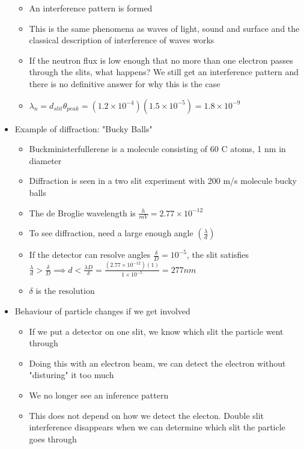 \documentclass[12pt]{article}
\begin{document}
\begin{itemize}
\begin{itemize}
        \item An interference pattern is formed
        \item This is the same phenomena as waves of light, sound and surface and the classical description of interference of waves works
        \item If the neutron flux is low enough that no more than one electron passes through the slits, what happens? We still get an interference pattern and there is no definitive answer for why this is the case
        \item $\lambda_n = d_{slit} \theta_{peak} = (1.2 \times 10^{-4})(1.5 \times 10^{-5}) = 1.8 \times 10^{-9}$
    \end{itemize}
    \item Example of diffraction: "Bucky Balls" \begin{itemize}
        \item Buckministerfullerene is a molecule consisting of 60 C atoms, 1 nm in diameter
        \item Diffraction is seen in a two slit experiment with 200 m/s molecule bucky balls 
        \item The de Broglie wavelength is $\frac{h}{mV} = 2.77 \times 10^{-12}$
        \item To see diffraction, need a large enough angle $(\frac{\lambda}{d})$
        \item If the detector can resolve angles $\frac{\delta}{D} = 10^{-5}$, the slit satisfies $\frac{\lambda}{d} > \frac{\delta}{D} \implies d < \frac{\lambda D}{\delta} = \frac{(2.77 \times 10^{-12})(1)}{1 \times 10^{-5}} = 277 nm$
        \item $\delta$ is the resolution
    \end{itemize}
    \item Behaviour of particle changes if we get involved \begin{itemize}
        \item If we put a detector on one slit, we know which slit the particle went through
        \item Doing this with an electron beam, we can detect the electron without "disturing" it too much
        \item We no longer see an inference pattern
        \item This does not depend on how we detect the electon. Double slit interference disappears when we can determine which slit the particle goes through
    \end{itemize}

\end{itemize}
\end{document}
